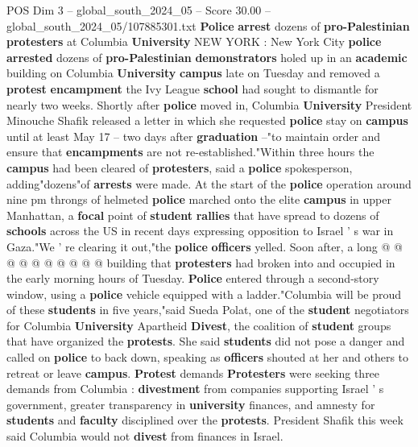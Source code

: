 \begin{textsample}{POS Dim 3 – global\_south\_2024\_05 – Score 30.00 – global\_south\_2024\_05/107885301.txt}  \label{ex:f3_pos_091}
\textbf{Police} \textbf{arrest} dozens of \textbf{pro-Palestinian} \textbf{protesters} at Columbia \textbf{University} NEW YORK : New York City \textbf{police} \textbf{arrested} dozens of \textbf{pro-Palestinian} \textbf{demonstrators} holed up in an \textbf{academic} building on Columbia \textbf{University} \textbf{campus} late on Tuesday and removed a \textbf{protest} \textbf{encampment} the Ivy League \textbf{school} had sought to dismantle for nearly two weeks.
Shortly after \textbf{police} moved in, Columbia \textbf{University} President Minouche Shafik released a letter in which she requested \textbf{police} stay on \textbf{campus} until at least May 17 -- two days after \textbf{graduation} --"to maintain order and ensure that \textbf{encampments} are not re-established."Within three hours the \textbf{campus} had been cleared of \textbf{protesters}, said a \textbf{police} spokesperson, adding"dozens"of \textbf{arrests} were made.
At the start of the \textbf{police} operation around nine pm throngs of helmeted \textbf{police} marched onto the elite \textbf{campus} in upper Manhattan, a \textbf{focal} point of \textbf{student} \textbf{rallies} that have spread to dozens of \textbf{schools} across the US in recent days expressing opposition to Israel ' s war in Gaza."We ' re clearing it out,"the \textbf{police} \textbf{officers} yelled.
Soon after, a long @ @ @ @ @ @ @ @ @ @ building that \textbf{protesters} had broken into and occupied in the early morning hours of Tuesday. \textbf{Police} entered through a second-story window, using a \textbf{police} vehicle equipped with a ladder."Columbia will be proud of these \textbf{students} in five years,"said Sueda Polat, one of the \textbf{student} negotiators for Columbia \textbf{University} Apartheid \textbf{Divest}, the coalition of \textbf{student} groups that have organized the \textbf{protests}.
She said \textbf{students} did not pose a danger and called on \textbf{police} to back down, speaking as \textbf{officers} shouted at her and others to retreat or leave \textbf{campus}. \textbf{Protest} demands \textbf{Protesters} were seeking three demands from Columbia : \textbf{divestment} from companies supporting Israel ' s government, greater transparency in \textbf{university} finances, and amnesty for \textbf{students} and \textbf{faculty} disciplined over the \textbf{protests}.
President Shafik this week said Columbia would not \textbf{divest} from finances in Israel.

\end{textsample}

